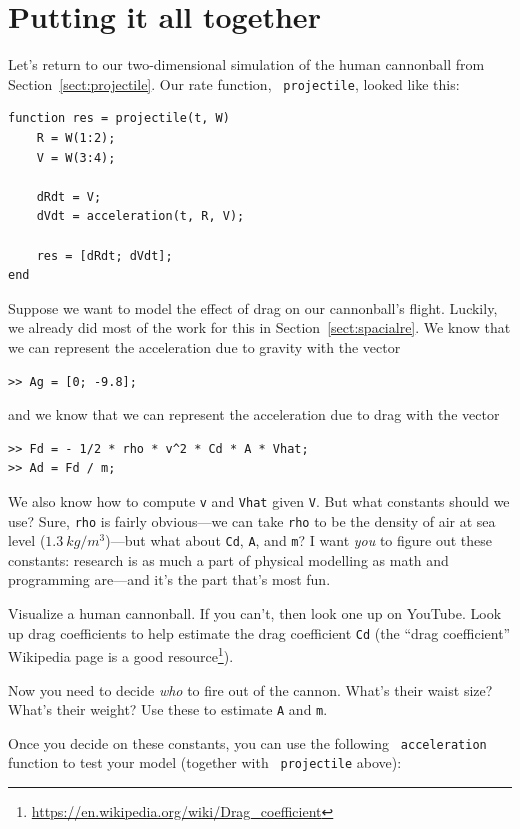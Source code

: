 \documentclass[
]{book}
\begin{document}
\section{Putting it all together}

Let's return to our two-dimensional simulation of the human cannonball
from Section~\ref{sect:projectile}. Our rate function, {\tt
projectile}, looked like this:

\begin{verbatim}
function res = projectile(t, W)
    R = W(1:2);
    V = W(3:4);

    dRdt = V;
    dVdt = acceleration(t, R, V);

    res = [dRdt; dVdt];
end
\end{verbatim}

Suppose we want to model the effect of drag on our cannonball's
flight. Luckily, we already did most of the work for this in
Section~\ref{sect:spacialre}. We know that we can represent the acceleration
due to gravity with the vector

\begin{verbatim}
>> Ag = [0; -9.8];
\end{verbatim}

and we know that we can represent the acceleration due to drag with the
vector

\begin{verbatim}
>> Fd = - 1/2 * rho * v^2 * Cd * A * Vhat;
>> Ad = Fd / m;
\end{verbatim}

We also know how to compute {\tt v} and {\tt Vhat} given {\tt V}. But
what constants should we use? Sure, {\tt rho} is fairly obvious---we can
take {\tt rho} to be the density of air at sea level ($1.3 ~
kg/m^3$)---but what about {\tt Cd}, {\tt A}, and {\tt m}? I want
\textit{you} to figure out these constants: research is as much a part
of physical modelling as math and programming are---and it's the part
that's most fun.

Visualize a human cannonball. If you can't, then look one up on
YouTube. Look up drag coefficients to help estimate the drag
coefficient {\tt Cd} (the ``drag coefficient'' Wikipedia page is a good
resource\footnote{\url{https://en.wikipedia.org/wiki/Drag_coefficient}}).

Now you need to decide \textit{who} to fire out of the cannon. What's
their waist size? What's their weight? Use these to estimate {\tt A} and
{\tt m}.

Once you decide on these constants, you can use the following {\tt
acceleration} function to test your model (together with {\tt
projectile} above):
\end{document}

